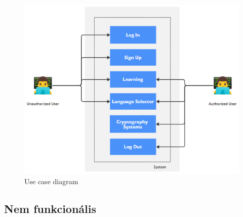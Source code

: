 \begin{figure}[!h]
	\centering
	\includegraphics[scale=0.6]{images/UseCaseDiagram}
	\caption{Use case diagram}
\end{figure}


\newpage
\subsection{Nem funkcionális}

